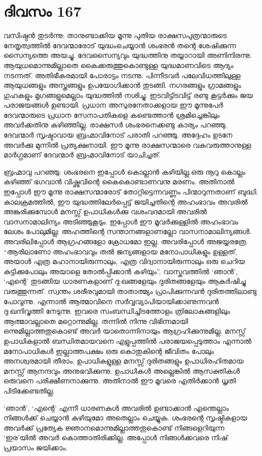 \section{ദിവസം 167}


വസിഷ്ഠൻ തുടർന്നു: താനുണ്ടാക്കിയ മൂന്നു പുതിയ രാക്ഷസപുത്രന്മാരുടെ നേതൃത്വത്തിൽ ദേവന്മാരോട് യുദ്ധംചെയ്യാൻ ശംഭരൻ തന്റെ ശേഷിക്കുന്ന സൈന്യത്തെ അയച്ചു. ദേവസൈന്യവും യുദ്ധത്തിനു തയ്യാറായി അണിനിരന്നു. ആയുധമൊന്നുമില്ലാതെ കൈക്കരുത്തുകൊണ്ടുള്ള യുദ്ധമാണവിടെ ആദ്യം നടന്നത്. അതിഭീകരമായി പോരാട്ടം നടന്നു. പിന്നീടവർ പലേവിധത്തിലുള്ള ആയുധങ്ങളും അസ്ത്രങ്ങളും ഉപയോഗിക്കാൻ തുടങ്ങി. നഗരങ്ങളും ഗ്രാമങ്ങളും ഗുഹകളും മൃഗങ്ങളുമെല്ലാം യുദ്ധത്തിൽ നശിച്ചു. ഇടവിട്ടിടവിട്ട് രണ്ടു കൂട്ടർക്കും ജയ പരാജയങ്ങൾ ഉണ്ടായി. പ്രധാന അസുരനേതാക്കളായ ഈ മൂന്നുപേർ ദേവന്മാരുടെ പ്രധാന സേനാപതികളെ കണ്ടെത്താൻ ശ്രമിച്ചെങ്കിലും അവർക്കതിനു കഴിഞ്ഞില്ല. രാക്ഷസർ ശംഭരനെക്കണ്ടു കാര്യം പറഞ്ഞു. ദേവന്മാർ സൃഷ്ടാവായ ബ്രഹ്മാവിനോട് പരാതി പറഞ്ഞു. അദ്ദേഹം ഉടനേ അവർക്കു മുന്നിൽ പ്രത്യക്ഷനായി. ഈ മൂന്നു രാക്ഷസന്മാരെ വകവരുത്താനുള്ള മാർഗ്ഗമാണ്‌ ദേവന്മാർ ബ്രഹ്മാവിനോട് യാചിച്ചത്.

ബ്രഹ്മാവു പറഞ്ഞു: ശംഭരനെ ഇപ്പോൾ കൊല്ലാൻ കഴിയില്ല.ഒരു നൂറു കൊല്ലം കഴിഞ്ഞ് ഭഗവാൻ വിഷ്ണുവിന്റെ കൈകൊണ്ടാണവനു മരണം. അതിനാൽ ഇപ്പോൾ ഈ മൂന്നു രാക്ഷസന്മാരോട് തോറ്റിട്ടെന്നവണ്ണം പിന്മാറുന്നതാണ്‌ ബുദ്ധി. കാലക്രമത്തിൽ, ഈ യുദ്ധത്തിലേർപ്പെട്ട് ജയിച്ചതിന്റെ അഹംഭാവം അവരിൽ അങ്കുരിക്കുമ്പോൾ മനസ്സ് ഉപാധികൾക്കു വശംവദമായി അവരിൽ വാസനാമാലിന്യം അടിഞ്ഞുകൂടും. ഇപ്പോള്‍ ഈ മൂവർക്കുള്ളിൽ അഹംഭാവം ലേശം പോലുമില്ല; അഹത്തിന്റെ സന്താനങ്ങളാണല്ലോ വാസനാമാലിന്യങ്ങൾ. അവരിലിപ്പോൾ ആഗ്രഹങ്ങളോ ക്രോധമോ ഇല്ല. അവരിപ്പോൾ അജയ്യരത്രേ. “ആരിലാണോ അഹംഭാവവും തൽ ജന്യങ്ങളായ മനോപാധികളും ഉള്ളത്, അയാൾ എത്ര മഹാനായിരുന്നാലും, എത്ര വിദ്വാനായിരുന്നാലും ഒരു ചെറിയ കുട്ടിക്കുപോലും അയാളെ തോല്‍പ്പിക്കാൻ കഴിയും”. വാസ്തവത്തിൽ ‘ഞാൻ’, ‘എന്റെ’ തുടങ്ങിയ ധാരണകളാണ്‌ ദു:ഖങ്ങളേയും ദുരിതങ്ങളേയും ആകർഷിച്ചു വരുത്തുന്നത്. സ്വന്തം ശരീരവുമായി താതാത്മ്യം പ്രാപിക്കുന്നവൻ ദുരിതത്തിലാണ്ടു പോവുന്നു. എന്നാൽ ആത്മാവിനെ സർവ്വവ്യാപിയായിക്കാണുന്നവൻ ദു:ഖനിവൃത്തി നേടുന്നു. ഇവരെ സംബന്ധിച്ചിടത്തോളം ത്രിലോകങ്ങളിലും ആത്മാവല്ലാതെ മറ്റൊന്നുമില്ല. തന്നിൽ നിന്നു വിഭിന്നമായി ഒന്നുമില്ലാത്തതുകൊണ്ട് അവർ യാതൊന്നിനായും ആഗ്രഹിക്കുന്നുമില്ല. മനസ്സ് ഉപാധികളാൽ ബന്ധിതമായവനെ എളുപ്പത്തിൽ പരാജയപ്പെടുത്താം എന്നാൽ മനോപാധികൾ ഇല്ലാത്തപക്ഷം ഒരു കൊതുകിന്റെ ജീവിതം പോലും അനശ്വരമായി തീരാം. ഉപാധികളുള്ള മനസ്സ് ദുരിതങ്ങളും ഉപാധിരഹിതമായ മനസ്സ് ആനന്ദവും അനുഭവിക്കുന്നു. ഉപാധികൾ അല്ലെങ്കിൽ ആസക്തികൾ ഒരുവനെ പരിക്ഷീണനാക്കുന്നു. അതിനാൽ ഈ മൂവരെ എതിർക്കാൻ ധൃതി പിടിക്കേണ്ടതില്ല.

‘ഞാൻ’, ‘എന്റെ’ എന്നീ ധാരണകൾ അവരിൽ ഉണ്ടാക്കാൻ എന്തെല്ലാം നിങ്ങൾക്ക് ചെയ്യാൻ കഴിയുമോ അതെല്ലാം ചെയ്യുക. ശംഭരന്റെ സൃഷ്ടികളായ അവർക്ക് പ്രത്യേക ജ്ഞാനമൊന്നുമില്ലാത്തതുകൊണ്ട് നിങ്ങളെറിയുന്ന ‘ഇര’യിൽ അവർ കൊത്താതിരിക്കില്ല. അപ്പോൾ നിങ്ങൾക്കവരെ നിഷ് പ്രയാസം ജയിക്കാം. 


